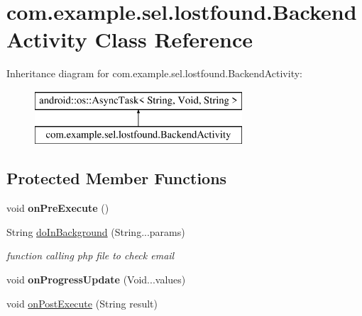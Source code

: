 \hypertarget{classcom_1_1example_1_1sel_1_1lostfound_1_1BackendActivity}{}\section{com.\+example.\+sel.\+lostfound.\+Backend\+Activity Class Reference}
\label{classcom_1_1example_1_1sel_1_1lostfound_1_1BackendActivity}
Inheritance diagram for com.\+example.\+sel.\+lostfound.\+Backend\+Activity\+:\begin{figure}[H]
\begin{center}
\leavevmode
\includegraphics[height=2.000000cm]{classcom_1_1example_1_1sel_1_1lostfound_1_1BackendActivity}
\end{center}
\end{figure}
\subsection*{Protected Member Functions}
\begin{DoxyCompactItemize}
\item 
void {\bfseries on\+Pre\+Execute} ()\hypertarget{classcom_1_1example_1_1sel_1_1lostfound_1_1BackendActivity_a679cd5822b3d0b71b8a947eab9ff6c79}{}\label{classcom_1_1example_1_1sel_1_1lostfound_1_1BackendActivity_a679cd5822b3d0b71b8a947eab9ff6c79}

\item 
String \hyperlink{classcom_1_1example_1_1sel_1_1lostfound_1_1BackendActivity_a4e9c46f342ba6738cdd50c9c75fb3ec7}{do\+In\+Background} (String...\+params)
\begin{DoxyCompactList}\small\item\em function calling php file to check email \end{DoxyCompactList}\item 
void {\bfseries on\+Progress\+Update} (Void...\+values)\hypertarget{classcom_1_1example_1_1sel_1_1lostfound_1_1BackendActivity_a6a2bf0fca03b89c35cd48befe848ee8d}{}\label{classcom_1_1example_1_1sel_1_1lostfound_1_1BackendActivity_a6a2bf0fca03b89c35cd48befe848ee8d}

\item 
void \hyperlink{classcom_1_1example_1_1sel_1_1lostfound_1_1BackendActivity_aa2e67993396f2bf74577e6ff84e16b44}{on\+Post\+Execute} (String result)
\end{DoxyCompactItemize}


